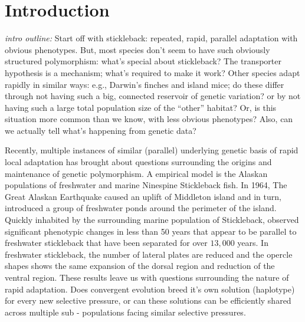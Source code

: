 \documentclass{article}
\newcommand{\jgg}[1]{\todo[linecolor=green,backgroundcolor=green!25,bordercolor=black]{#1}}
\begin{document}
\section{Introduction}

%

\emph{intro outline:}
Start off with stickleback: repeated, rapid, parallel adaptation with obvious phenotypes.
But, most species don't seem to have such obviously structured polymorphism: 
what's special about stickleback?
The transporter hypothesis is a mechanism; what's required to make it work?
Other species adapt rapidly in similar ways:
e.g., Darwin's finches and island mice;
do these differ through not having such a big, connected reservoir of genetic variation?
or by not having such a large total population size of the ``other'' habitat?
Or, is this situation more common than we know, with less obvious phenotypes?
Also, can we actually tell what's happening from genetic data?

Recently, multiple instances of similar (parallel) underlying genetic basis of rapid local adaptation has brought about 
questions surrounding the origins and maintenance of genetic polymorphism.
A empirical model is the Alaskan populations of freshwater and marine Ninespine Stickleback fish.
In 1964, The Great Alaskan Earthquake caused an uplift of Middleton island and in turn,
introduced a group of freshwater ponds around the perimeter of the island. 
Quickly inhabited by the surrounding marine population of Stickleback,
\citet{lescak2015evolution} observed significant phenotypic changes in less than 50 years that appear to be 
parallel to freshwater stickleback that have been separated for over $13,000$ years.
In freshwater stickleback, the number of lateral plates are reduced
and the opercle shapes shows the same expansion of the dorsal region and reduction of the ventral region.
These results leave us with questions surrounding the nature of rapid adaptation.
Does convergent evolution breed it's own solution (haplotype) for every new selective pressure, 
or can these solutions can be efficiently shared across multiple sub - populations facing similar selective pressures. 
\end{document}
